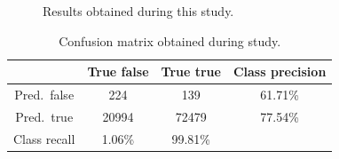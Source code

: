 \documentclass[a4paper]{article}
\begin{document}
			\begin{figure}[p]
				\centering
				\quad
				\caption{Results obtained during this study.}
				\label{fig:my_results}
			\end{figure}
		
			\begin{table}[p]
				\centering
				\caption{Confusion matrix obtained during study.}
				\label{tab:confusion_matrix}
				\begin{tabular}{@{}cl|cc|c@{}}
					\toprule
					\multicolumn{2}{c|}{}             & True false & True true & Class precision \\ \midrule
					\multicolumn{2}{c|}{\multirow{2}{*}{Pred.~false}} & \multirow{2}{*}{224}   & \multirow{2}{*}{139}   & \multirow{2}{*}{61.71\%} \\
					\multicolumn{2}{c|}{}             &            &           &                 \\
					\multicolumn{2}{c|}{\multirow{2}{*}{Pred.~true}}  & \multirow{2}{*}{20994} & \multirow{2}{*}{72479} & \multirow{2}{*}{77.54\%} \\
					\multicolumn{2}{c|}{}             &            &           &                 \\ \midrule
					\multicolumn{2}{c|}{Class recall} & 1.06\%     & 99.81\%   &                 \\ \bottomrule
				\end{tabular}%
			\end{table}
		
\end{document}
